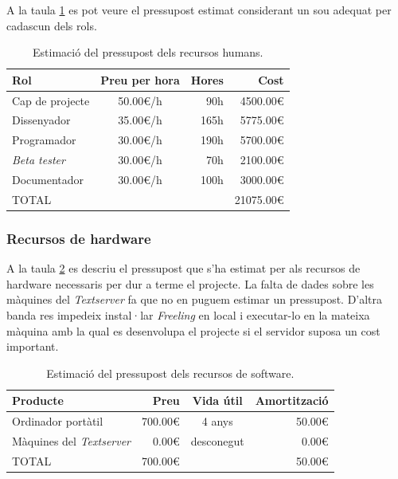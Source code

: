 \documentclass[10pt,a4paper]{article}
\begin{document}
A la taula \ref{tab:recursos_humans} es pot veure el pressupost estimat considerant un sou adequat per cadascun dels rols.

\begin{table}[!htb]
    \centering
    \begin{tabular}{|l||c|r|r|}
        \hline
         Rol & Preu per hora & Hores & Cost \\
         \hline\hline
         Cap de projecte & 50.00€/h & 90h & 4500.00€ \\
         Dissenyador & 35.00€/h & 165h & 5775.00€ \\
         Programador & 30.00€/h & 190h & 5700.00€ \\
         \emph{Beta tester} & 30.00€/h & 70h & 2100.00€ \\
         Documentador & 30.00€/h & 100h & 3000.00€ \\
         \hline\hline
         TOTAL & & & 21075.00€ \\
         \hline
    \end{tabular}
    \caption{Estimació del pressupost dels recursos humans.}
    \label{tab:recursos_humans}
\end{table}

\subsubsection{Recursos de hardware}

A la taula \ref{tab:recursos_hardware} es descriu el pressupost que s'ha estimat per als recursos de hardware necessaris per dur a terme el projecte. La falta de dades sobre les màquines del \emph{Textserver} fa que no en puguem estimar un pressupost. D'altra banda res impedeix instal·lar \emph{Freeling} en local i executar-lo en la mateixa màquina amb la qual es desenvolupa el projecte si el servidor suposa un cost important.

\begin{table}[]
    \centering
    \begin{tabular}{|l||r|c|r|}
        \hline
         Producte & Preu & Vida útil & Amortització \\
         \hline\hline
         Ordinador portàtil & 700.00€ & 4 anys & 50.00€ \\
         Màquines del \emph{Textserver} & 0.00€ & desconegut & 0.00€ \\
         \hline\hline
         TOTAL & 700.00€ & & 50.00€ \\
         \hline
    \end{tabular}
    \caption{Estimació del pressupost dels recursos de software.}
    \label{tab:recursos_hardware}
\end{table}
\end{document}

